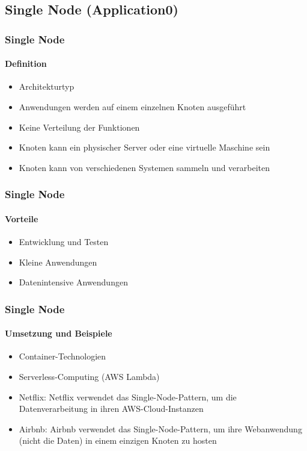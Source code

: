 \subsection{Single Node (Application0)}
\begin{frame}
  \frametitle{Single Node }
  \framesubtitle{Definition}
  \begin{itemize}
    \item Architekturtyp
    \item Anwendungen werden auf einem einzelnen Knoten ausgeführt
    \item Keine Verteilung der Funktionen
    \item Knoten kann ein physischer Server oder eine virtuelle Maschine sein
    \item Knoten kann von verschiedenen Systemen sammeln und verarbeiten
  \end{itemize}
\end{frame}

\begin{frame}
  \frametitle{Single Node }
  \framesubtitle{Vorteile}
  \begin{itemize}
    \item Entwicklung und Testen
    \item Kleine Anwendungen
    \item Datenintensive Anwendungen
  \end{itemize}
\end{frame}

\begin{frame}
  \frametitle{Single Node }
  \framesubtitle{Umsetzung und Beispiele}
  \begin{itemize}
    \item Container-Technologien
    \item Serverless-Computing (AWS Lambda)
    \item Netflix: Netflix verwendet das Single-Node-Pattern, um die Datenverarbeitung in ihren AWS-Cloud-Instanzen
    \item Airbnb: Airbnb verwendet das Single-Node-Pattern, um ihre Webanwendung (nicht die Daten) in einem einzigen Knoten zu hosten
  \end{itemize}
\end{frame}